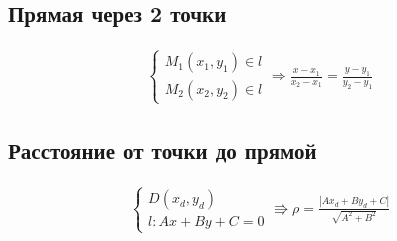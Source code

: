 \documentclass{article}
\begin{document}
\subsection{Прямая через 2 точки}

\begin{gather*}
	\begin{cases}
		M_1(x_1, y_1) \in l \\
		M_2(x_2, y_2) \in l
	\end{cases} \Rightarrow \frac{x - x_1}{x_2 - x_1} = \frac{y - y_1}{y_2 - y_1}
\end{gather*}

\subsection{Расстояние от точки до прямой}

\begin{gather*}
	\begin{cases}
		D(x_d, y_d) \\
		l: Ax + By + C = 0
	\end{cases} \Rrightarrow \rho = \frac{|Ax_d + By_d + C|}{\sqrt{A^2 + B^2}}
\end{gather*}
\end{document}
